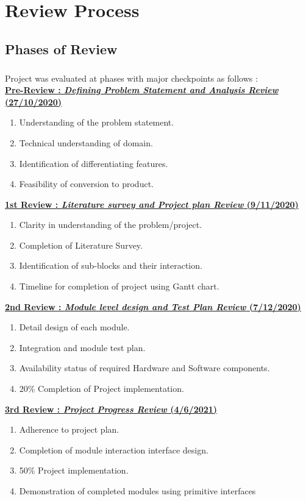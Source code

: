 \appendix
\chapter{Review Process}
\section{Phases of Review}
\paragraph{} Project was evaluated at phases with major checkpoints as follows :\\

\textbf {\underline{Pre-Review :  \textit{Defining Problem Statement and Analysis Review} (27/10/2020)}}
\begin{enumerate}
\item Understanding of the problem statement.  
\item Technical understanding of domain. 
\item Identification of differentiating features.
\item Feasibility of conversion to product.
\end{enumerate}

\textbf {\underline{1st Review :  \textit{Literature survey and Project plan Review } (9/11/2020)}}
\begin{enumerate}
\item Clarity in understanding of the problem/project. 
\item Completion of Literature Survey. 
\item Identification of sub-blocks and their interaction.
\item Timeline for completion of project using Gantt chart.
\end{enumerate}

\textbf {\underline{2nd Review :  \textit{Module level design and Test Plan Review} (7/12/2020)}}
\begin{enumerate}
\item Detail design of each module. 
\item Integration and module test plan. 
\item Availability status of required Hardware and Software components.
\item 20\% Completion of Project implementation.
\end{enumerate}
\newpage
    
\textbf {\underline{3rd Review :  \textit{Project Progress Review} (4/6/2021)}}
\begin{enumerate}
\item Adherence to project plan.
\item Completion of module interaction interface design.
\item 50\% Project implementation.
\item Demonstration of completed modules using primitive interfaces 
\end{enumerate}


